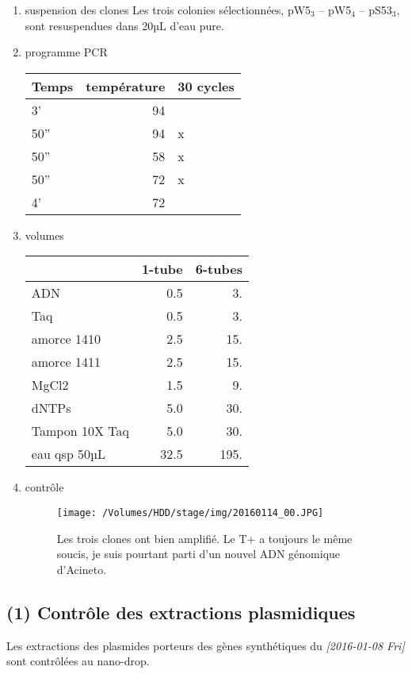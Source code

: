\documentclass[9pt, oneside, twocolumn]{scrartcl}
\begin{document}
\begin{enumerate}
\item suspension des clones
\label{sec:orgheadline30}
Les trois colonies sélectionnées, pW5\(_{\text{3}}\) -- pW5\(_{\text{4}}\) -- pS53\(_{\text{3}}\), sont resuspendues
dans 20µL d'eau pure. 
\item programme PCR
\label{sec:orgheadline31}
\begin{center}
\begin{tabular}{lrl}
\toprule
Temps & température & 30 cycles\\
\midrule
3' & 94 & \\
50'' & 94 & x\\
50'' & 58 & x\\
50'' & 72 & x\\
4' & 72 & \\
\bottomrule
\end{tabular}
\end{center}

\item volumes
\label{sec:orgheadline32}
\begin{center}
\begin{tabular}{lrr}
\toprule
 & 1-tube & 6-tubes\\
\midrule
ADN & 0.5 & 3.\\
Taq & 0.5 & 3.\\
amorce 1410 & 2.5 & 15.\\
amorce 1411 & 2.5 & 15.\\
MgCl2 & 1.5 & 9.\\
dNTPs & 5.0 & 30.\\
Tampon 10X Taq & 5.0 & 30.\\
\midrule
eau qsp 50µL & 32.5 & 195.\\
\bottomrule
\end{tabular}
\end{center}

\item contrôle
\label{sec:orgheadline33}

\begin{figure}[htb]
\centering
\texttt{[image: /Volumes/HDD/stage/img/20160114\_00.JPG]}
\caption{Les trois clones ont bien amplifié. Le T+ a toujours le même soucis, je suis pourtant parti d'un nouvel ADN génomique d'Acineto.}
\end{figure}
\end{enumerate}

\subsection{(1) Contrôle des extractions plasmidiques}
\label{sec:orgheadline36}
Les extractions des plasmides porteurs des gènes synthétiques du
\textit{[2016-01-08 Fri] } sont contrôlées au nano-drop.
\end{document}
